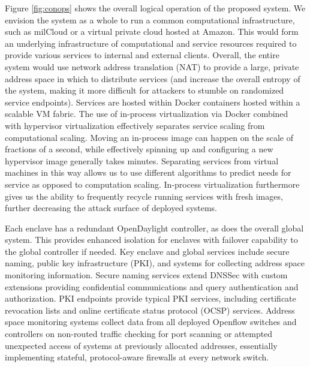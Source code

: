 \documentclass{sbir}
\begin{document}
Figure \ref{fig:conops} shows the overall logical operation of the proposed system.  We envision the system as a whole to run a common computational infrastructure, such as  milCloud or a virtual private cloud hosted at Amazon.  This would form an underlying infrastructure of computational and service resources required to provide various services to internal and external clients.  Overall, the entire system would use network address translation (NAT) to provide a large, private address space in which to distribute services (and increase the overall entropy of the system, making it more difficult for attackers to stumble on randomized service endpoints).  Services are hosted within Docker containers hosted within a scalable VM fabric. The use of in-process virtualization via Docker combined with hypervisor virtualization effectively separates service scaling from computational scaling. Moving an in-process image can happen on the scale of fractions of a second, while effectively spinning up and configuring a new hypervisor image generally takes minutes. Separating services from virtual machines in this way allows us to use different algorithms to predict needs for service as opposed to computation scaling.  In-process virtualization furthermore gives us the ability to frequently recycle running services with fresh images, further decreasing the attack surface of deployed systems.

Each enclave has a redundant OpenDaylight controller, as does the overall global system.  This provides enhanced isolation for enclaves with failover capability to the global controller if needed.  Key enclave and global services include secure naming, public key infrastructure (PKI), and systems for collecting address space monitoring information.  Secure naming services extend DNSSec with custom extensions providing confidential communications and query authentication and authorization.  PKI endpoints provide typical PKI services, including certificate revocation lists and online certificate status protocol (OCSP) services.  Address space monitoring systems collect data from all deployed Openflow switches and controllers on non-routed traffic checking for port scanning or attempted unexpected access of systems at previously allocated addresses, essentially implementing stateful, protocol-aware firewalls at every network switch.
\end{document}
